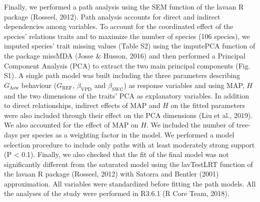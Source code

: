 \documentclass[11pt,twoside]{reedthesis}
\begin{document}
Finally, we performed a path analysis using the SEM function of the
lavaan R package (Rosseel, 2012). Path analysis accounts for direct and
indirect dependencies among variables. To account for the coordinated
effect of the species' relations traits and to maximize the number of
species (106 species), we imputed species' trait missing values (Table
S2) using the imputePCA function of the package missMDA (Josse \&
Husson, 2016) and then performed a Principal Component Analysis (PCA) to
extract the two main principal components (Fig. S1). A single path model
was built including the three parameters describing \(G_{\text{Asw}}\)
behaviour (\(G_{\text{REF}}\), \(\beta_{\text{VPD}}\) and
\(\beta_{\text{SWC}}\)) as response variables and using MAP, \(H\) and
the two dimensions of the traits' PCA as explanatory variables. In
addition to direct relationships, indirect effects of MAP and \(H\) on
the fitted parameters were also included through their effect on the PCA
dimensions (Liu et al., 2019). We also accounted for the effect of MAP
on \(H\). We included the number of tree-days per species as a weighting
factor in the model. We performed a model selection procedure to include
only paths with at least moderately strong support (P \textless{} 0.1).
Finally, we also checked that the fit of the final model was not
significantly different from the saturated model using the lavTestLRT
function of the lavaan R package (Rosseel, 2012) with Satorra and
Bentler (2001) approximation. All variables were standardized before
fitting the path models. All the analyses of the study were performed in
R3.6.1 (R Core Team, 2018).\par
\end{document}
